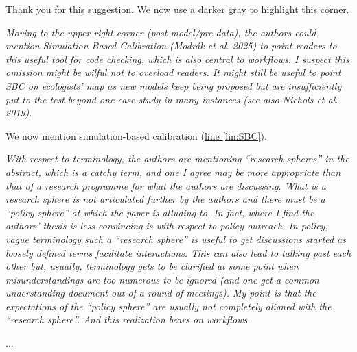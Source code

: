 \documentclass[11pt,letter]{article}
\begin{document}
Thank you for this suggestion. We now use a darker gray to highlight this corner.

\begin{mybox}
\emph{Moving to the upper right corner (post-model/pre-data), the authors could mention
Simulation-Based Calibration (Modrák et al. 2025) to point readers to this useful tool for code
checking, which is also central to workflows. I suspect this omission might be wilful not to
overload readers. It might still be useful to point SBC on ecologists’ map as new models keep
being proposed but are insufficiently put to the test beyond one case study in many instances
(see also Nichols et al. 2019).}  
\end{mybox}

We now mention simulation-based calibration (\href{file:forecastflows_r2\#lintarget:SBC}{line \ref*{lin:SBC}}).

\begin{mybox}
\emph{With respect to terminology, the authors are mentioning “research spheres” in the abstract,
which is a catchy term, and one I agree may be more appropriate than that of a research
programme for what the authors are discussing. What is a research sphere is not articulated
further by the authors and there must be a “policy sphere” at which the paper is alluding to. In
fact, where I find the authors’ thesis is less convincing is with respect to policy outreach. In
policy, vague terminology such a “research sphere” is useful to get discussions started as
loosely defined terms facilitate interactions. This can also lead to talking past each other but,
usually, terminology gets to be clarified at some point when misunderstandings are too
numerous to be ignored (and one get a common understanding document out of a round of
meetings). My point is that the expectations of the “policy sphere” are usually not completely
aligned with the “research sphere”. And this realization bears on workflows.}  
\end{mybox}

...
\end{document}

